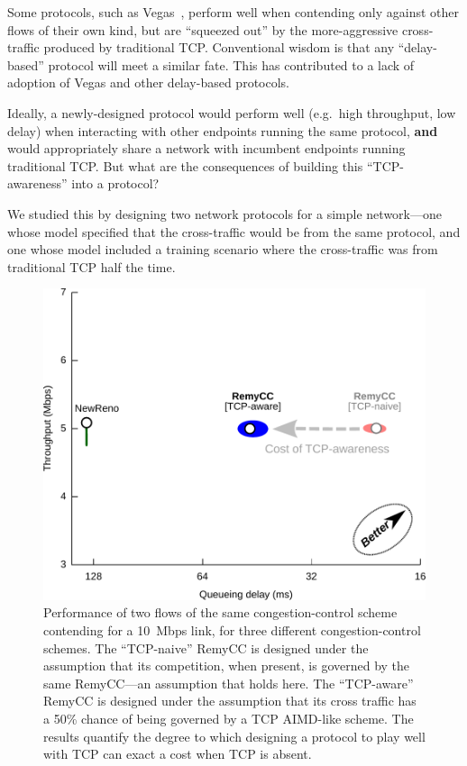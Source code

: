 Some protocols, such as Vegas~\cite{vegas}, perform well when
contending only against other flows of their own kind, but are
``squeezed out'' by the more-aggressive cross-traffic produced by
traditional TCP. Conventional wisdom is that any ``delay-based''
protocol will meet a similar fate. This has contributed to a lack of
adoption of Vegas and other delay-based protocols.

Ideally, a newly-designed protocol would perform well (e.g.~high
throughput, low delay) when interacting with other endpoints running
the same protocol, \textbf{and} would appropriately share a network
with incumbent endpoints running traditional TCP. But what are the
consequences of building this ``TCP-awareness'' into a protocol?

We studied this by designing two network protocols for a simple
network---one whose model specified that the cross-traffic would be
from the same protocol, and one whose model included a training
scenario where the cross-traffic was from traditional TCP half the
time.

\begin{figure}
\caption{Performance of two flows of the same congestion-control
  scheme contending for a 10~Mbps link, for three different
  congestion-control schemes. The ``TCP-naive'' RemyCC is designed
  under the assumption that its competition, when present, is governed
  by the same RemyCC---an assumption that holds here. The
  ``TCP-aware'' RemyCC is designed under the assumption that its cross
  traffic has a 50\% chance of being governed by a TCP AIMD-like
  scheme. The results quantify the degree to which designing a
  protocol to play well with TCP can exact a cost when TCP is absent.}
\label{fig:tcphomog}
\begin{center}
\includegraphics[width=\textwidth]{homo-3.pdf}
\end{center}
\end{figure}


